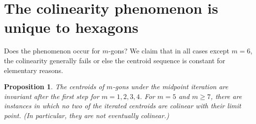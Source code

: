 \documentclass{amsart}
\newtheorem{proposition}[theorem]{Proposition}
\theoremstyle{definition}
\begin{document}
\section{The colinearity phenomenon is unique to hexagons}
Does the phenomenon occur for $m$-gons? We claim that in all cases except $m=6$, the colinearity generally fails or else the centroid sequence is constant for elementary reasons.

\begin{proposition}
    The centroids of $m$-gons under the midpoint iteration are invariant after the first step for $m=1,2,3,4$. For $m=5$ and $m\ge 7$, there are instances in which no two of the iterated centroids are colinear with their limit point. (In particular, they are not eventually colinear.)
    \label{prop:m-gon_behavior}
\end{proposition}
\end{document}
